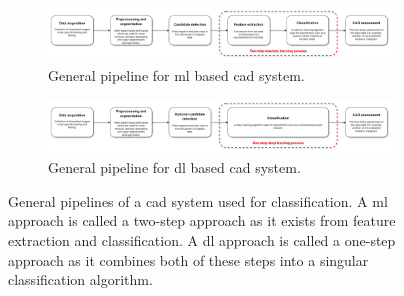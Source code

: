 \begin{figure}[ht]
  \begin{minipage}{\textwidth}
    \centering
    \begin{subfigure}{0.95\textwidth}
        \centering
        \includegraphics[width=\textwidth]{images/introduction/cad_pipeline_ml.png}
        \captionsetup{width=0.9\linewidth}
        \captionsetup{justification=centering}
        \caption{General pipeline for \gls{ml} based \gls{cad} system.}
        \label{fig:cad_pipeline_ml}
    \end{subfigure}
    \hfill
    \begin{subfigure}{.95\textwidth}
        \centering
        \includegraphics[width=\textwidth]{images/introduction/cad_pipeline_dl.png}
        \captionsetup{width=0.9\linewidth}
        \captionsetup{justification=centering}
        \caption{General pipeline for \gls{dl} based \gls{cad} system.}
        \label{fig:cad_pipeline_dl}
    \end{subfigure}
    \captionsetup{width=0.9\linewidth}
    \captionsetup{justification=centering}
    \caption{General pipelines of a \gls{cad} system used for classification. A \gls{ml} approach is called a two-step approach as it exists from feature extraction and classification. A \gls{dl} approach is called a one-step approach as it combines both of these steps into a singular classification algorithm.}
    \label{fig:cad_pipeline}
  \end{minipage}  
\end{figure}

